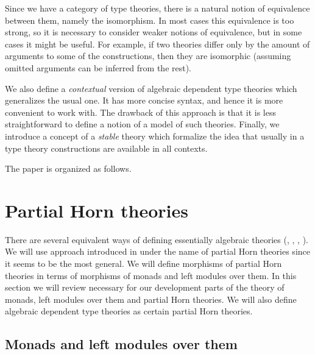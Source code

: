 \documentclass[reqno]{amsart}
\theoremstyle{definition}
\theoremstyle{remark}
\numberwithin{figure}{section}
\begin{document}
Since we have a category of type theories, there is a natural notion of equivalence between them, namely the isomorphism.
In most cases this equivalence is too strong, so it is necessary to consider weaker notions of equivalence, but in some cases it might be useful.
For example, if two theories differ only by the amount of arguments to some of the constructions,
then they are isomorphic (assuming omitted arguments can be inferred from the rest).

We also define a \emph{contextual} version of algebraic dependent type theories which generalizes the usual one.
It has more concise syntax, and hence it is more convenient to work with.
The drawback of this approach is that it is less straightforward to define a notion of a model of such theories.
Finally, we introduce a concept of a \emph{stable} theory which formalize the idea that usually in a type theory constructions are available in all contexts.

The paper is organized as follows.

\section{Partial Horn theories}
\label{sec:PHT}

There are several equivalent ways of defining essentially algebraic theories (\cite{LPC}, \cite{GAT}, \cite{PHL}, \cite[D 1.3.4]{elephant}).
We will use approach introduced in \cite{PHL} under the name of partial Horn theories since it seems to be the most general.
We will define morphisms of partial Horn theories in terms of morphisms of monads and left modules over them.
In this section we will review necessary for our development parts of the theory of monads, left modules over them and partial Horn theories.
We will also define algebraic dependent type theories as certain partial Horn theories.

\subsection{Monads and left modules over them}
\end{document}
